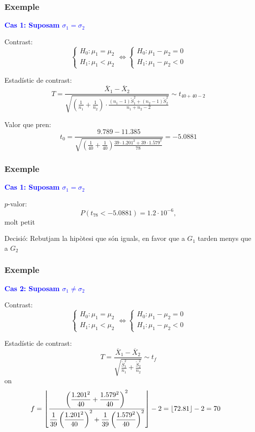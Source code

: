 \documentclass[12pt,t]{beamer}
\newcommand{\blue}[1]{\textcolor{blue}{#1}}
\renewcommand{\emph}[1]{{\color{red}#1}}
\theoremstyle{plain}
\theoremstyle{definition}
\begin{document}
\begin{frame}
\frametitle{Exemple}
\vspace*{-2ex}

\textbf{\blue{Cas 1: Suposam $\sigma_1=\sigma_2$}}
\medskip

\emph{Contrast}:
$$
\left\{\begin{array}{l}
H_0:\mu_1=\mu_2\\
H_1:\mu_1< \mu_2
\end{array}\right.
\Longleftrightarrow
\left\{\begin{array}{l}
H_0:\mu_1-\mu_2=0\\
H_1:\mu_1- \mu_2<0
\end{array}\right.
$$

\emph{Estadístic de contrast}: 
$$
T=\frac{\overline{X}_1-\overline{X}_2}%
{\sqrt{(\frac{1}{n_1}+\frac{1}{n_2})\cdot 
\frac{(n_1-1)\widetilde{S}_1^2+(n_2-1)\widetilde{S}_2^2}%
{n_1+n_2-2}}}\sim t_{40+40-2}
$$

\medskip

\emph{Valor que pren}: 
$$
t_0=\frac{9.789-11.385}{\sqrt{(\frac{1}{40}+\frac{1}{40})\frac{39\cdot 1.201^2+39\cdot 1.579^2}{78}}}=-5.0881
$$
\end{frame}

\begin{frame}
\frametitle{Exemple}
\vspace*{-2ex}

\textbf{\blue{Cas 1: Suposam $\sigma_1=\sigma_2$}}
\medskip

\emph{$p$-valor}: 
$$
P(t_{78}<-5.0881)= 1.2\cdot 10^{-6},
$$
molt petit
\medskip

\emph{Decisió}: Rebutjam la hipòtesi que són iguals, en favor que a $G_1$ tarden menys que a $G_2$
\end{frame}




\begin{frame}
\frametitle{Exemple}
\vspace*{-2ex}

\textbf{\blue{Cas 2: Suposam $\sigma_1\neq \sigma_2$}}
\medskip

\emph{Contrast}:
$$
\left\{\begin{array}{l}
H_0:\mu_1=\mu_2\\
H_1:\mu_1< \mu_2
\end{array}\right.
\Longleftrightarrow
\left\{\begin{array}{l}
H_0:\mu_1-\mu_2=0\\
H_1:\mu_1- \mu_2<0
\end{array}\right.
$$

\emph{Estadístic de contrast}: 
$$
T=\frac{\overline{X}_1-\overline{X}_2}{\sqrt{\frac{\widetilde{S}_1^2}{n_1}+\frac{\widetilde{S}_2^2}{n_2}}}\sim t_f
$$
on
{\small
$$
\hspace*{-2ex}f=\left\lfloor\frac{\displaystyle \left( \frac{1.201^2}{40}+\frac{1.579^2}{40}\right)^2}%
{\displaystyle \frac{1}{39}\left(\frac{1.201^2}{40}\right)^2+\frac{1}{39}\left(\frac{1.579^2}{40}\right)^2}\right\rfloor -2
=\lfloor 72.81\rfloor-2=70
$$
}
\end{frame}
\end{document}
